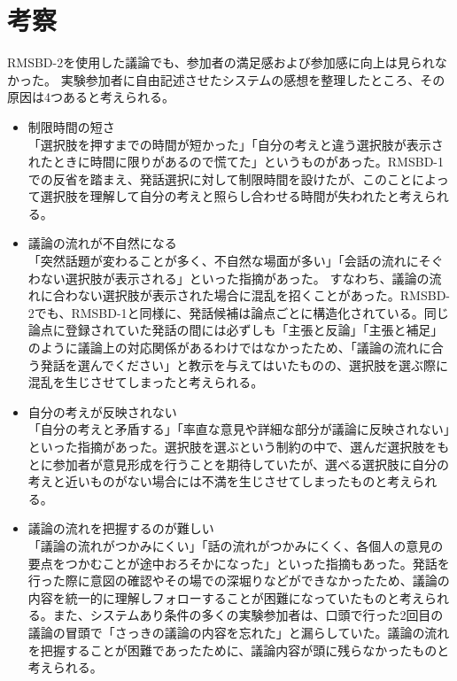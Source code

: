 \documentclass[11pt, a4paper]{jreport} %
\begin{document}
\section{考察}
RMSBD-2を使用した議論でも、参加者の満足感および参加感に向上は見られなかった。%
実験参加者に自由記述させたシステムの感想を整理したところ、その原因は4つあると考えられる。
\begin{itemize}
\item 制限時間の短さ\\
「選択肢を押すまでの時間が短かった」「自分の考えと違う選択肢が表示されたときに時間に限りがあるので慌てた」というものがあった。RMSBD-1での反省を踏まえ、発話選択に対して制限時間を設けたが、このことによって選択肢を理解して自分の考えと照らし合わせる時間が失われたと考えられる。%
\item 議論の流れが不自然になる\\
「突然話題が変わることが多く、不自然な場面が多い」「会話の流れにそぐわない選択肢が表示される」といった指摘があった。
すなわち、議論の流れに合わない選択肢が表示された場合に混乱を招くことがあった。RMSBD-2でも、RMSBD-1と同様に、発話候補は論点ごとに構造化されている。同じ論点に登録されていた発話の間には必ずしも「主張と反論」「主張と補足」のように議論上の対応関係があるわけではなかったため、「議論の流れに合う発話を選んでください」と教示を与えてはいたものの、選択肢を選ぶ際に混乱を生じさせてしまったと考えられる。
\item 自分の考えが反映されない\\
「自分の考えと矛盾する」「率直な意見や詳細な部分が議論に反映されない」といった指摘があった。選択肢を選ぶという制約の中で、選んだ選択肢をもとに参加者が意見形成を行うことを期待していたが、選べる選択肢に自分の考えと近いものがない場合には不満を生じさせてしまったものと考えられる。
\item 議論の流れを把握するのが難しい\\
「議論の流れがつかみにくい」「話の流れがつかみにくく、各個人の意見の要点をつかむことが途中おろそかになった」といった指摘もあった。発話を行った際に意図の確認やその場での深堀りなどができなかったため、議論の内容を統一的に理解しフォローすることが困難になっていたものと考えられる。また、システムあり条件の多くの実験参加者は、口頭で行った2回目の議論の冒頭で「さっきの議論の内容を忘れた」と漏らしていた。議論の流れを把握することが困難であったために、議論内容が頭に残らなかったものと考えられる。
\end{itemize}
\end{document}
